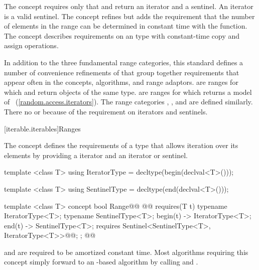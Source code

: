 \begin{addedblock}
\pnum
The  concept requires only that  and 
return an iterator and a sentinel. \enternote An iterator is a valid sentinel.
\exitnote The  concept refines  but adds
the requirement that the number of elements in the range can be determined
in constant time with the  function. The  concept describes
requirements on an  type with constant-time copy and assign
operations.

\pnum
In addition to the three fundamental range categories, this standard defines
a number of convenience refinements of  that group together requirements
that appear often in the concepts, algorithms, and range adaptors.
 are ranges for which  and  return objects of the
same type.  are ranges for which
 returns a model of
~(\ref{random.access.iterators}). The range
categories ,
,
 and
 are defined similarly.
\enternote There  no  or
 because of the 
requirement on iterators and sentinels. \exitnote {}

[iterable.iterables]{Ranges}

\pnum
The  concept defines the requirements of a type that allows
iteration over its elements by providing a  iterator and an
 iterator or sentinel.

\begin{codeblock}
template <class T>
using IteratorType = decltype(begin(declval<T>()));

template <class T>
using SentinelType = decltype(end(declval<T>()));

template <class T>
concept bool Range@\newtxt{() \{}\oldtxt{ =}@
  @@ requires(T t) {
    typename IteratorType<T>;
    typename SentinelType<T>;
    { begin(t) } -> IteratorType<T>;
    { end(t) } -> SentinelType<T>;
    requires Sentinel<SentinelType<T>, IteratorType<T>>@\newtxt{()}@;
  };
@\newtxt{\}}@
\end{codeblock}

 and  are required to be amortized constant time.
\enternote Most algorithms requiring this concept simply forward to an
-based algorithm by calling  and . \exitnote


\end{addedblock}

